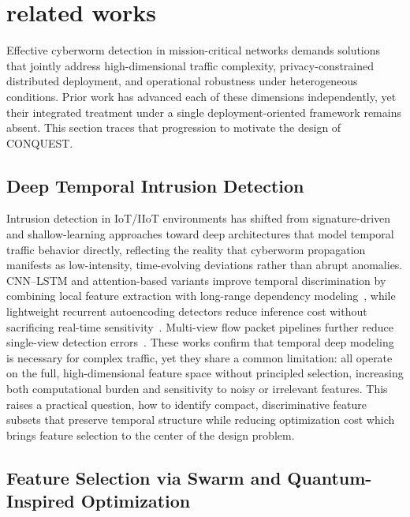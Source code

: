 \documentclass[conference]{IEEEtran}
\begin{document}
\section{\textbf{related works}}
\label{sec:related_works}

Effective cyberworm detection in mission-critical networks demands
solutions that jointly address high-dimensional traffic complexity,
privacy-constrained distributed deployment, and operational
robustness under heterogeneous conditions. Prior work has advanced
each of these dimensions independently, yet their integrated
treatment under a single deployment-oriented framework remains
absent. This section traces that progression to motivate the design
of CONQUEST.

\subsection{Deep Temporal Intrusion Detection}

Intrusion detection in IoT/IIoT environments has shifted from
signature-driven and shallow-learning approaches toward deep
architectures that model temporal traffic behavior directly,
reflecting the reality that cyberworm propagation manifests as
low-intensity, time-evolving deviations rather than abrupt
anomalies. CNN--LSTM and attention-based variants improve temporal
discrimination by combining local feature extraction with long-range
dependency modeling~\cite{phalaagaehybrid,yuadaptive}, while
lightweight recurrent autoencoding detectors reduce inference cost
without sacrificing real-time sensitivity~\cite{yupgtad}. Multi-view
flow packet pipelines further reduce single-view detection
errors~\cite{sudyanaflow}. These works confirm that temporal deep
modeling is necessary for complex traffic, yet they share a common
limitation: all operate on the full, high-dimensional feature space
without principled selection, increasing both computational burden
and sensitivity to noisy or irrelevant features. This raises a
practical question, how to identify compact, discriminative feature
subsets that preserve temporal structure while reducing optimization
cost which brings feature selection to the center of the design
problem.

\subsection{Feature Selection via Swarm and Quantum-Inspired Optimization}
\end{document}

